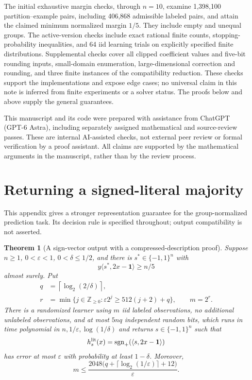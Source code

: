 \documentclass[11pt,a4paper]{article}
\newtheorem{theorem}{Theorem}
\theoremstyle{remark}
\newcommand{\sgnplus}{\operatorname{sgn}_{+}}
\newcommand{\ip}[2]{\langle #1,#2\rangle}
\newcommand{\1}{\mathbf 1}
\begin{document}
The initial exhaustive margin checks, through $n=10$, examine
1,398,100 partition--example pairs, including 406,868 admissible labeled
pairs, and attain the claimed minimum normalized margin $1/5$.
They include empty and unequal groups. The active-version checks include
exact rational finite counts, stopping-probability inequalities, and 64
iid learning trials on explicitly specified finite distributions.
Supplemental checks cover all clipped coefficient values and five-bit rounding
inputs, small-domain enumeration, large-dimensional correction and rounding,
and three finite instances of the compatibility reduction. These checks support
the implementations and expose edge cases; no universal claim in this note is
inferred from finite experiments or a solver status. The proofs below and above
supply the general guarantees.

This manuscript and its code were prepared with assistance from ChatGPT
(GPT-6 Astra), including separately assigned mathematical and source-review
passes. These are internal AI-assisted checks, not external peer review or
formal verification by a proof assistant. All claims are supported by the
mathematical arguments in the manuscript, rather than by the review process.

\appendix
\section{Returning a signed-literal majority}\label{app:proper}

This appendix gives a stronger representation guarantee for the group-normalized
prediction task. Its decision rule is specified throughout; output compatibility
is not asserted.

\begin{theorem}[A sign-vector output with a compressed-description proof]
\label{thm:proper}
Suppose $n\ge1$, $0<\varepsilon<1$, $0<\delta\le1/2$, and there is
$s^*\in\{-1,1\}^n$ with
\[
 y\ip{s^*}{2x-\1}\ge n/5
\]
almost surely. Put
\begin{align}
 q&=\left\lceil\log_2(2/\delta)\right\rceil, \label{eq:properq}\\
 r&=\min\{j\in\mathbb Z_{\ge0}:
       \varepsilon 2^j\ge512(j+2)+q\},\qquad m=2^r. \label{eq:properm}
\end{align}
There is a randomized learner using $m$ iid labeled observations, no additional
unlabeled observations, and at most $5nq$ independent random bits, which runs
in time polynomial in $n,1/\varepsilon,\log(1/\delta)$ and returns
$s\in\{-1,1\}^n$ such that
\[
 h_s^{\rm lit}(x)=\sgnplus(\ip{s}{2x-\1})
\]
has error at most $\varepsilon$ with probability at least $1-\delta$.
Moreover,
\begin{equation}\label{eq:properexplicit}
 m\le
 \frac{2048\big(q+\lceil\log_2(1/\varepsilon)\rceil+12\big)}{\varepsilon}.
\end{equation}
\end{theorem}
\end{document}
